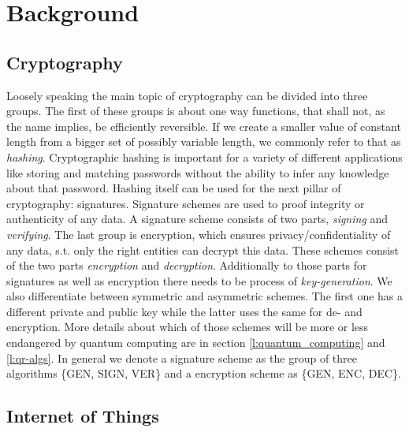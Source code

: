 \documentclass[conference]{IEEEtran}
\newcommand{\comment}[1]{}
\begin{document}
\section{Background}\label{background}
\subsection{Cryptography}\label{bg:crypto}
Loosely speaking the main topic of cryptography can be divided into three groups.
The first of these groups is about one way functions, that shall not, as the name implies, be efficiently reversible.
If we create a smaller value of constant length from a bigger set of possibly variable length, we commonly refer to that as \textit{hashing}.
Cryptographic hashing is important for a variety of different applications like storing and matching passwords without the ability to infer any knowledge about that password.
Hashing itself can be used for the next pillar of cryptography: signatures.
Signature schemes are used to proof integrity or authenticity of any data.
A signature scheme consists of two parts, \textit{signing} and \textit{verifying}. 
The last group is encryption, which ensures privacy/confidentiality of any data, s.t. only the right entities can decrypt this data.
These schemes consist of the two parts \textit{encryption} and \textit{decryption}.
Additionally to those parts for signatures as well as encryption there needs to be process of \textit{key-generation}.
We also differentiate between symmetric and asymmetric schemes. The first one has a different private and public key while the latter uses the same for de- and encryption.
More details about which of those schemes will be more or less endangered by quantum computing are in section \ref{l:quantum_computing} and \ref{l:qr-algs}.
\newline
In general we denote a signature scheme as the group of three algorithms \{GEN, SIGN, VER\} and a encryption scheme as \{GEN, ENC, DEC\}.

\subsection{Internet of Things}\label{bg:iot}
\comment{ %
} %
\end{document}
